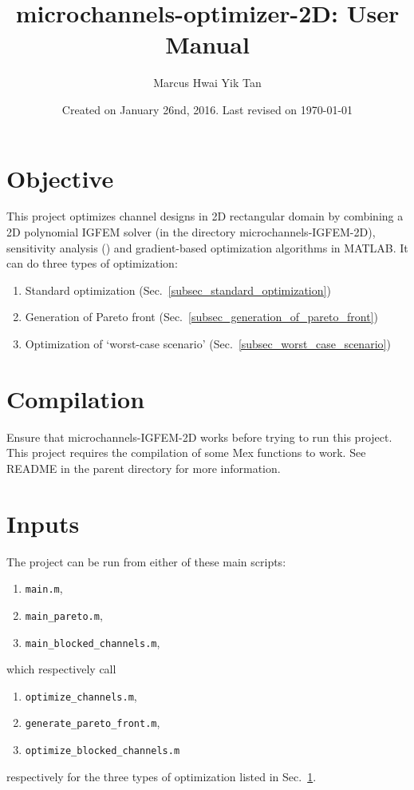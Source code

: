 \documentclass[11pt,letterpaper]{article}
\title{microchannels-optimizer-2D: User Manual}
\author{Marcus Hwai Yik Tan}
\date{Created on January 26nd, 2016. Last revised on \today}
\renewcommand\cite[1]{(\citet{#1})}
\begin{document}
\maketitle

\section{Objective}
\label{sec_objective}
This project optimizes channel designs in 2D rectangular domain by combining a 2D polynomial IGFEM solver (in the directory microchannels-IGFEM-2D), sensitivity analysis \cite{Tan16,Najafi15} and gradient-based optimization algorithms in MATLAB. It can do three types of optimization:
\begin{enumerate}
\item Standard optimization (Sec.\ \ref{subsec_standard_optimization})
\item Generation of Pareto front (Sec.\ \ref{subsec_generation_of_pareto_front})
\item Optimization of `worst-case scenario' (Sec.\ \ref{subsec_worst_case_scenario}) 
\end{enumerate}


\section{Compilation}
Ensure that microchannels-IGFEM-2D works before trying to run this project. This project requires the compilation of some Mex functions to work. See README in the parent directory for more information. 

\section{Inputs}
The project can be run from either of these main scripts:
\begin{enumerate}
\item  \texttt{main.m},
\item  \texttt{main\_pareto.m},
\item \texttt{main\_blocked\_channels.m},
\end{enumerate}
which respectively call
\begin{enumerate}
\item  \texttt{optimize\_channels.m}, 
\item \texttt{generate\_pareto\_front.m},
\item  \texttt{optimize\_blocked\_channels.m}
\end{enumerate}
respectively for the three types of optimization listed in Sec.\ \ref{sec_objective}. 
\end{document}
